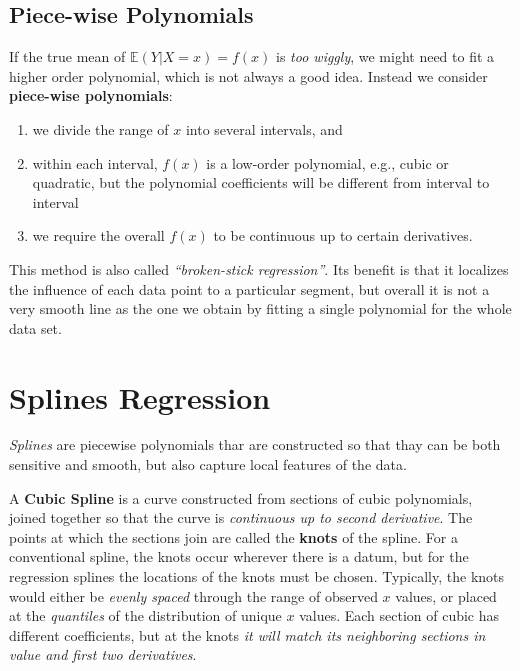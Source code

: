 \documentclass[
]{book}
\begin{document}
\subsection{Piece-wise Polynomials}\label{piece-wise-polynomials}

If the true mean of \(\mathbb{E}(Y|X=x) = f(x)\) is \emph{too wiggly}, we might need to fit a higher order polynomial, which is not always a good idea. Instead we consider \textbf{piece-wise polynomials}:

\begin{enumerate}
\def\labelenumi{\arabic{enumi}.}
\item
  we divide the range of \(x\) into several intervals, and
\item
  within each interval, \(f(x)\) is a low-order polynomial, e.g., cubic or quadratic, but the polynomial coefficients will be different from interval to interval
\item
  we require the overall \(f(x)\) to be continuous up to certain derivatives.
\end{enumerate}

This method is also called \emph{``broken-stick regression''}. Its benefit is that it localizes the influence of each data point to a particular segment, but overall it is not a very smooth line as the one we obtain by fitting a single polynomial for the whole data set.

\section{Splines Regression}\label{splines-regression}

\emph{Splines} are piecewise polynomials thar are constructed so that thay can be both sensitive and smooth, but also capture local features of the data.

A \textbf{Cubic Spline} is a curve constructed from sections of cubic polynomials, joined together so that the curve is \emph{continuous up to second derivative}. The points at which the sections join are called the \textbf{knots} of the spline. For a conventional spline, the knots occur wherever there is a datum, but for the regression splines the locations of the knots must be chosen. Typically, the knots would either be \emph{evenly spaced} through the range of observed \(x\) values, or placed at the \emph{quantiles} of the distribution of unique \(x\) values. Each section of cubic has different coefficients, but at the knots \emph{it will match its neighboring sections in value and first two derivatives}.
\end{document}
